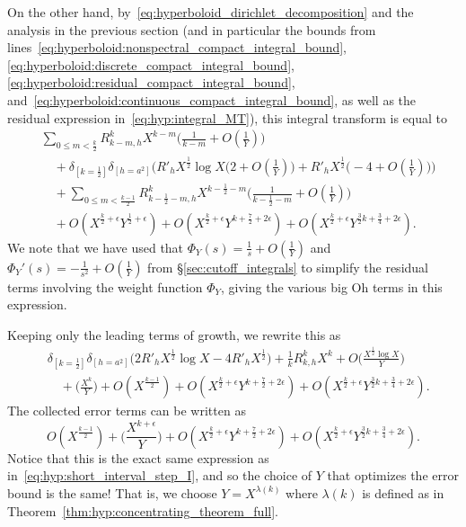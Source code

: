 On the other hand, by~\eqref{eq:hyperboloid_dirichlet_decomposition} and the analysis in
the previous section (and in particular the bounds from
lines~\eqref{eq:hyperboloid:nonspectral_compact_integral_bound},
\eqref{eq:hyperboloid:discrete_compact_integral_bound},
\eqref{eq:hyperboloid:residual_compact_integral_bound},
and~\eqref{eq:hyperboloid:continuous_compact_integral_bound}, as well as the residual
expression in~\eqref{eq:hyp:integral_MT}), this integral
transform is equal to
\begin{align}
  &\sum_{0 \leq m < \frac{k}{2}} R_{k-m, h}^k X^{k-m} \big( \tfrac{1}{k-m} +
O(\tfrac{1}{Y}) \big) \\
  &\quad + \delta_{[k = \frac{1}{2}]} \delta_{[h = a^2]} \bigg( R'_h X^{\frac{1}{2}} \log
X \big(2 + O(\tfrac{1}{Y}) \big) + R'_h X^{\frac{1}{2}} \big( -4 + O(\tfrac{1}{Y}) \big)
\bigg) \\
  &\quad + \sum_{0 \leq m < \frac{k-1}{2}} R_{k - \frac{1}{2} - m,h}^k X^{k - \frac{1}{2}
- m} \big( \tfrac{1}{k - \frac{1}{2} - m} + O(\tfrac{1}{Y})\big) \\
  &\quad + O(X^{\frac{k}{2} + \epsilon} Y^{\frac{1}{2} + \epsilon}) + O(X^{\frac{k}{2} +
  \epsilon} Y^{k + \frac{7}{2} + 2\epsilon}) + O(X^{\frac{k}{2} + \epsilon}
Y^{\frac{3}{2}k + \frac{3}{4} + 2\epsilon}).
\end{align}
We note that we have used that $\Phi_Y(s) = \frac{1}{s} + O(\frac{1}{Y})$ and
$\Phi_Y'(s) = -\frac{1}{s^2} + O(\frac{1}{Y})$ from \S\ref{sec:cutoff_integrals}
to simplify the residual terms involving the weight function $\Phi_Y$, giving
the various big Oh terms in this expression.




Keeping only the leading terms of growth, we rewrite this as
\begin{align}
  &\delta_{[k = \frac{1}{2}]} \delta_{[h = a^2]} \bigg( 2 R'_h X^{\frac{1}{2}} \log X -4
R'_h X^{\frac{1}{2}} \bigg) + \tfrac{1}{k} R_{k, h}^k X^{k} +  O\big(\frac{X^{\frac{1}{2}}
\log X}{Y}\big) \\
  &\quad + \big(\frac{X^{k}}{Y}\big) + O(X^{\frac{k-1}{2}}) + O(X^{\frac{k}{2} + \epsilon}
  Y^{k + \frac{7}{2} + 2\epsilon}) + O(X^{\frac{k}{2} + \epsilon} Y^{\frac{3}{2}k +
\frac{3}{4} + 2\epsilon}).
\end{align}
The collected error terms can be written as
\begin{equation}
  O(X^{\frac{k-1}{2}}) + \big(\frac{X^{k+\epsilon}}{Y}\big) + O(X^{\frac{k}{2} + \epsilon}
  Y^{k + \frac{7}{2} + 2\epsilon}) + O(X^{\frac{k}{2} + \epsilon} Y^{\frac{3}{2}k +
\frac{3}{4} + 2\epsilon}).
\end{equation}
Notice that this is the exact same expression as in~\eqref{eq:hyp:short_interval_step_I},
and so the choice of $Y$ that optimizes the error bound is the same!
That is, we choose $Y = X^{\lambda(k)}$ where $\lambda(k)$ is defined as in
Theorem~\ref{thm:hyp:concentrating_theorem_full}.


